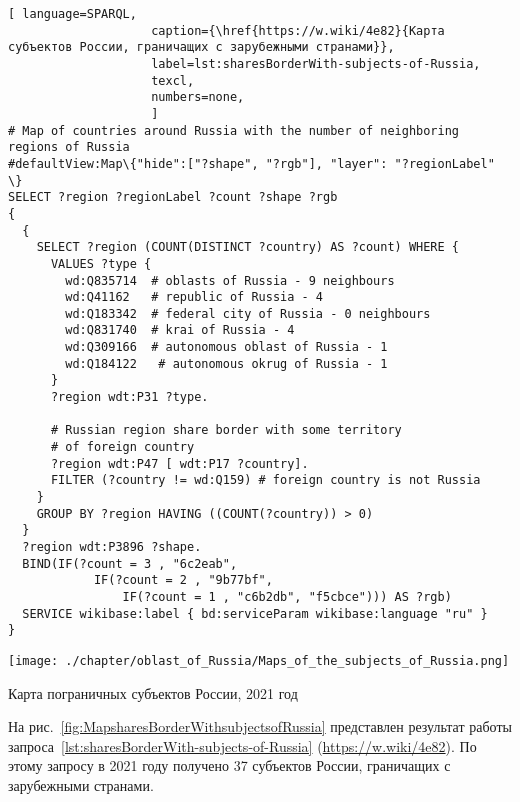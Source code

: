 \lstset{numbers=left, firstnumber=1, frame=single}
\begin{lstlisting}[ language=SPARQL, 
                    caption={\href{https://w.wiki/4e82}{Карта субъектов России, граничащих с зарубежными странами}},
                    label=lst:sharesBorderWith-subjects-of-Russia,
                    texcl,
                    numbers=none,
                    ]
# Map of countries around Russia with the number of neighboring regions of Russia
#defaultView:Map\{"hide":["?shape", "?rgb"], "layer": "?regionLabel" \}
SELECT ?region ?regionLabel ?count ?shape ?rgb
{
  {
    SELECT ?region (COUNT(DISTINCT ?country) AS ?count) WHERE {
      VALUES ?type {
        wd:Q835714  # oblasts of Russia - 9 neighbours
        wd:Q41162   # republic of Russia - 4
        wd:Q183342  # federal city of Russia - 0 neighbours
        wd:Q831740  # krai of Russia - 4
        wd:Q309166  # autonomous oblast of Russia - 1
        wd:Q184122   # autonomous okrug of Russia - 1
      }
      ?region wdt:P31 ?type.
  
      # Russian region share border with some territory 
      # of foreign country
      ?region wdt:P47 [ wdt:P17 ?country].
      FILTER (?country != wd:Q159) # foreign country is not Russia
    }
    GROUP BY ?region HAVING ((COUNT(?country)) > 0)
  }
  ?region wdt:P3896 ?shape.
  BIND(IF(?count = 3 , "6c2eab", 
            IF(?count = 2 , "9b77bf", 
                IF(?count = 1 , "c6b2db", "f5cbce"))) AS ?rgb)
  SERVICE wikibase:label { bd:serviceParam wikibase:language "ru" }  
}
\end{lstlisting}%
\begin{marginfigure}[-42\baselineskip]
	\texttt{[image: ./chapter/oblast\_of\_Russia/Maps\_of\_the\_subjects\_of\_Russia.png]}
	\caption[Карта пограничных субъектов России, 2021 год.]
    {Карта пограничных субъектов России, 2021 год}%
      \label{fig:MapsharesBorderWithsubjectsofRussia}%
\end{marginfigure}

На рис.~\ref{fig:MapsharesBorderWithsubjectsofRussia} представлен 
результат работы 
запроса~\ref{lst:sharesBorderWith-subjects-of-Russia} (\href{https://w.wiki/4e82}{https://w.wiki/4e82}).
По этому запросу в 2021 году получено 37 субъектов России, граничащих с зарубежными странами. 



